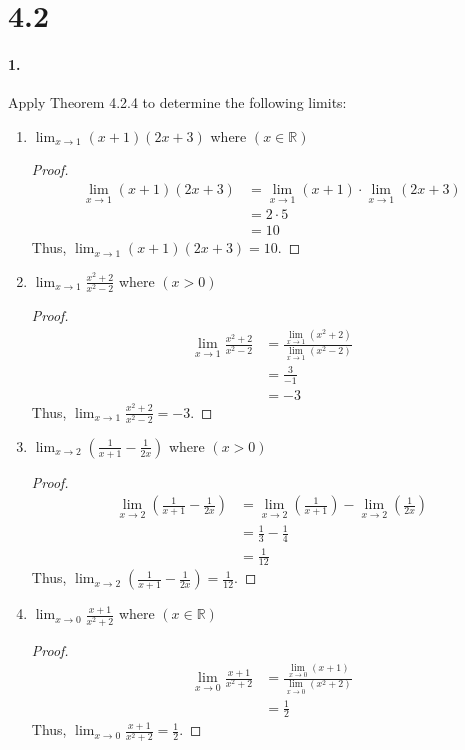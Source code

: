 \documentclass[12pt]{article}
\newcommand\R{\mathbb{R}}
\theoremstyle{remark}
\begin{document}
\section*{4.2}
\paragraph{1.} Apply Theorem 4.2.4 to determine the following limits:
\begin{enumerate}[label=(\alph*)]
    \item $\lim_{x \to 1} (x + 1)(2x + 3)$ where $(x \in \R)$
    \begin{proof}
        \begin{align*}
            \lim_{x \to 1} (x + 1)(2x + 3) &= \lim_{x \to 1} (x + 1) \cdot \lim_{x \to 1} (2x + 3) \\
            &= 2 \cdot 5 \\
            &= 10
        \end{align*}
        Thus, $\lim_{x \to 1} (x + 1)(2x + 3) = 10$.
    \end{proof}

    \item $\lim_{x \to 1} \frac{x^2 + 2}{x^2 - 2}$ where $(x > 0)$
    \begin{proof}
        \begin{align*}
            \lim_{x \to 1} \frac{x^2 + 2}{x^2 - 2} &= \frac{\lim_{x \to 1} (x^2 + 2)}{\lim_{x \to 1} (x^2 - 2)} \\
            &= \frac{3}{-1} \\
            &= -3
        \end{align*}
        Thus, $\lim_{x \to 1} \frac{x^2 + 2}{x^2 - 2} = -3$.
    \end{proof}

    \item $\lim_{x \to 2} (\frac{1}{x + 1} - \frac{1}{2x})$ where $(x > 0)$
    \begin{proof}
        \begin{align*}
            \lim_{x \to 2} \left(\frac{1}{x + 1} - \frac{1}{2x}\right) &= \lim_{x \to 2} \left(\frac{1}{x + 1}\right) - \lim_{x \to 2} \left(\frac{1}{2x}\right) \\
            &= \frac{1}{3} - \frac{1}{4} \\
            &= \frac{1}{12}
        \end{align*}
        Thus, $\lim_{x \to 2} (\frac{1}{x + 1} - \frac{1}{2x}) = \frac{1}{12}$.
    \end{proof}

    \item $\lim_{x \to 0} \frac{x + 1}{x^2 + 2}$ where $(x \in \R)$
    \begin{proof}
        \begin{align*}
            \lim_{x \to 0} \frac{x + 1}{x^2 + 2} &= \frac{\lim_{x \to 0} (x + 1)}{\lim_{x \to 0} (x^2 + 2)} \\
            &= \frac{1}{2}
        \end{align*}
        Thus, $\lim_{x \to 0} \frac{x + 1}{x^2 + 2} = \frac{1}{2}$.
    \end{proof}
\end{enumerate}
\end{document}
